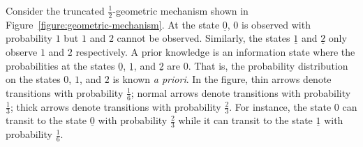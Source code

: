 Consider the truncated $\frac{1}{2}$-geometric mechanism shown in
Figure~\ref{figure:geometric-mechanism}. At the state $\underline{0}$,
$0$ is observed with probability $1$ but $1$ and $2$ cannot be
observed. Similarly, the states $\underline{1}$ and $\underline{2}$
only observe $1$ and $2$ respectively. A prior knowledge is an
information state where the probabilities at the states $\underline{0}$,
$\underline{1}$, and $\underline{2}$ are $0$. That is, the probability
distribution on the states $0$, $1$, and $2$ is known \emph{a priori}.
In the figure, thin arrows denote transitions with probability
$\frac{1}{6}$; normal arrows denote transitions with probability
$\frac{1}{3}$; thick arrows denote transitions with probability
$\frac{2}{3}$. For instance, the state $0$ can transit to the state
$\underline{0}$ with probability $\frac{2}{3}$ while it can transit to
the state $\underline{1}$ with probability $\frac{1}{6}$.
